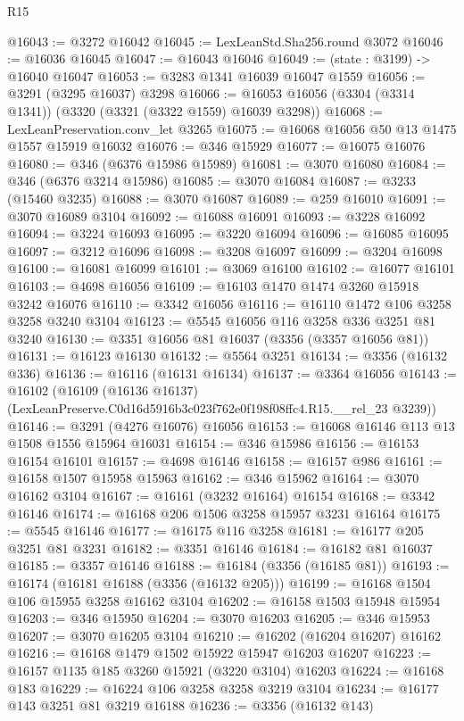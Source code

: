 \begin{lexlean}{R15}
\begin{coremodule}
@16043 := @3272 @16042
@16045 := LexLeanStd.Sha256.round @3072
@16046 := @16036 @16045
@16047 := @16043 @16046
@16049 := (state : @3199) -> @16040 @16047
@16053 := @3283 @1341 @16039 @16047 @1559
@16056 := @3291 (@3295 @16037) @3298
@16066 := @16053 @16056 (@3304 (@3314 @1341)) (@3320 (@3321 (@3322 @1559) @16039 @3298))
@16068 := LexLeanPreservation.conv_let @3265
@16075 := @16068 @16056 @50 @13 @1475 @1557 @15919 @16032
@16076 := @346 @15929
@16077 := @16075 @16076
@16080 := @346 (@6376 @15986 @15989)
@16081 := @3070 @16080
@16084 := @346 (@6376 @3214 @15986)
@16085 := @3070 @16084
@16087 := @3233 (@15460 @3235)
@16088 := @3070 @16087
@16089 := @259 @16010
@16091 := @3070 @16089 @3104
@16092 := @16088 @16091
@16093 := @3228 @16092
@16094 := @3224 @16093
@16095 := @3220 @16094
@16096 := @16085 @16095
@16097 := @3212 @16096
@16098 := @3208 @16097
@16099 := @3204 @16098
@16100 := @16081 @16099
@16101 := @3069 @16100
@16102 := @16077 @16101
@16103 := @4698 @16056
@16109 := @16103 @1470 @1474 @3260 @15918 @3242 @16076
@16110 := @3342 @16056
@16116 := @16110 @1472 @106 @3258 @3258 @3240 @3104
@16123 := @5545 @16056 @116 @3258 @336 @3251 @81 @3240
@16130 := @3351 @16056 @81 @16037 (@3356 (@3357 @16056 @81))
@16131 := @16123 @16130
@16132 := @5564 @3251
@16134 := @3356 (@16132 @336)
@16136 := @16116 (@16131 @16134)
@16137 := @3364 @16056
@16143 := @16102
    (@16109 (@16136 @16137) (LexLeanPreserve.C0d16d5916b3c023f762e0f198f08ffc4.R15.__rel_23 @3239))
@16146 := @3291 (@4276 @16076) @16056
@16153 := @16068 @16146 @113 @13 @1508 @1556 @15964 @16031
@16154 := @346 @15986
@16156 := @16153 @16154 @16101
@16157 := @4698 @16146
@16158 := @16157 @986
@16161 := @16158 @1507 @15958 @15963
@16162 := @346 @15962
@16164 := @3070 @16162 @3104
@16167 := @16161 (@3232 @16164) @16154
@16168 := @3342 @16146
@16174 := @16168 @206 @1506 @3258 @15957 @3231 @16164
@16175 := @5545 @16146
@16177 := @16175 @116 @3258
@16181 := @16177 @205 @3251 @81 @3231
@16182 := @3351 @16146
@16184 := @16182 @81 @16037
@16185 := @3357 @16146
@16188 := @16184 (@3356 (@16185 @81))
@16193 := @16174 (@16181 @16188 (@3356 (@16132 @205)))
@16199 := @16168 @1504 @106 @15955 @3258 @16162 @3104
@16202 := @16158 @1503 @15948 @15954
@16203 := @346 @15950
@16204 := @3070 @16203
@16205 := @346 @15953
@16207 := @3070 @16205 @3104
@16210 := @16202 (@16204 @16207) @16162
@16216 := @16168 @1479 @1502 @15922 @15947 @16203 @16207
@16223 := @16157 @1135 @185 @3260 @15921 (@3220 @3104) @16203
@16224 := @16168 @183
@16229 := @16224 @106 @3258 @3258 @3219 @3104
@16234 := @16177 @143 @3251 @81 @3219 @16188
@16236 := @3356 (@16132 @143)

\end{coremodule}
\end{lexlean}
